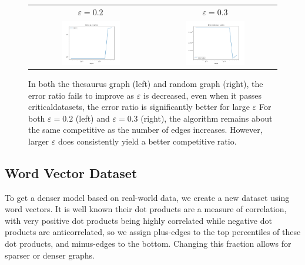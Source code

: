 \documentclass[
]{article}
\begin{document}
\begin{figure}[!htb]
  \begin{tabular}{cc}
    {\(\varepsilon  = 0.2\)} & {\(\varepsilon = 0.3\)}                                 \\
    \includegraphics[width=0.5\textwidth]{images/error_ratio_as_eps_varies_loglog_thesaurus.png}
                             &
    \includegraphics[width=0.5\textwidth]{images/error_ratio_as_eps_varies_loglog.png} \\
  \end{tabular}
  \caption{\label{fig:error-ratio-small-eps}
    In both the thesaurus graph (left) and random graph (right), the error
    ratio fails to improve as $\varepsilon$ is decreased, even when it passes
    criticaldatasets, the error ratio is significantly better for large $\varepsilon$
    For both $\varepsilon = 0.2$ (left) and $\varepsilon = 0.3$ (right), the
    algorithm remains about the same competitive as the number of edges
    increases. However, larger $\varepsilon$ does consistently yield
    a better competitive ratio.}
\end{figure}

\hypertarget{word-vector-dataset}{%
  \subsection{Word Vector Dataset}\label{word-vector-dataset}}


To get a denser model based on real-world data, we create a new dataset
using word vectors. It is well known their dot products are a measure of
correlation, with very positive dot products being highly correlated
while negative dot products are anticorrelated, so we assign plus-edges
to the top percentiles of these dot products, and minus-edges to the
bottom. Changing this fraction allows for sparser or denser graphs.
\end{document}
